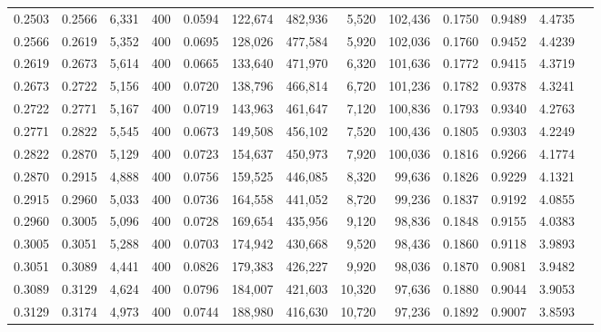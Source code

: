 \begin{tabular}{rrrrrrrrrrrrr}
0.2503 & 0.2566 &  6,331 & 400 &                                     0.0594 & 122,674 & 482,936 &   5,520 & 102,436 & 0.1750 & 0.9489 & 4.4735 \\
0.2566 & 0.2619 &  5,352 & 400 &                                     0.0695 & 128,026 & 477,584 &   5,920 & 102,036 & 0.1760 & 0.9452 & 4.4239 \\
0.2619 & 0.2673 &  5,614 & 400 &                                     0.0665 & 133,640 & 471,970 &   6,320 & 101,636 & 0.1772 & 0.9415 & 4.3719 \\
0.2673 & 0.2722 &  5,156 & 400 &                                     0.0720 & 138,796 & 466,814 &   6,720 & 101,236 & 0.1782 & 0.9378 & 4.3241 \\
0.2722 & 0.2771 &  5,167 & 400 &                                     0.0719 & 143,963 & 461,647 &   7,120 & 100,836 & 0.1793 & 0.9340 & 4.2763 \\
0.2771 & 0.2822 &  5,545 & 400 &                                     0.0673 & 149,508 & 456,102 &   7,520 & 100,436 & 0.1805 & 0.9303 & 4.2249 \\
0.2822 & 0.2870 &  5,129 & 400 &                                     0.0723 & 154,637 & 450,973 &   7,920 & 100,036 & 0.1816 & 0.9266 & 4.1774 \\
0.2870 & 0.2915 &  4,888 & 400 &                                     0.0756 & 159,525 & 446,085 &   8,320 &  99,636 & 0.1826 & 0.9229 & 4.1321 \\
0.2915 & 0.2960 &  5,033 & 400 &                                     0.0736 & 164,558 & 441,052 &   8,720 &  99,236 & 0.1837 & 0.9192 & 4.0855 \\
0.2960 & 0.3005 &  5,096 & 400 &                                     0.0728 & 169,654 & 435,956 &   9,120 &  98,836 & 0.1848 & 0.9155 & 4.0383 \\
0.3005 & 0.3051 &  5,288 & 400 &                                     0.0703 & 174,942 & 430,668 &   9,520 &  98,436 & 0.1860 & 0.9118 & 3.9893 \\
0.3051 & 0.3089 &  4,441 & 400 &                                     0.0826 & 179,383 & 426,227 &   9,920 &  98,036 & 0.1870 & 0.9081 & 3.9482 \\
0.3089 & 0.3129 &  4,624 & 400 &                                     0.0796 & 184,007 & 421,603 &  10,320 &  97,636 & 0.1880 & 0.9044 & 3.9053 \\
0.3129 & 0.3174 &  4,973 & 400 &                                     0.0744 & 188,980 & 416,630 &  10,720 &  97,236 & 0.1892 & 0.9007 & 3.8593 \\

\end{tabular}
